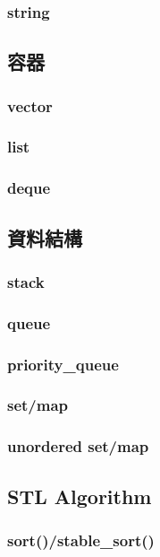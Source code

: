 \documentclass{article}
\begin{document}
\subsubsection{string}

\subsection{容器}
\subsubsection{vector}

\subsubsection{list}

\subsubsection{deque}

\subsection{資料結構}
\subsubsection{stack}

\subsubsection{queue}

\subsubsection{priority\_queue}

\subsubsection{set/map}

\subsubsection{unordered set/map}

\subsection{STL Algorithm}
\subsubsection{sort()/stable\_sort()}
\end{document}
